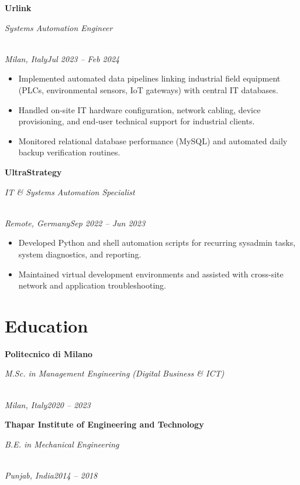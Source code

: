 \documentclass[a4paper,10pt]{article}
\newcommand{\role}[4]{\vspace{3pt}\noindent\hspace{0.6em}\parbox[t]{0.38\textwidth}{\raggedright\textbf{#1}}\hfill\parbox[t]{0.58\textwidth}{\raggedleft\textit{#2}}\\{\textit{#3}\hfill\textit{#4}}\vspace{1pt}}
\begin{document}
\role{Urlink}{Systems Automation Engineer}{Milan, Italy}{Jul 2023 -- Feb 2024}
\begin{itemize}
\item Implemented automated data pipelines linking industrial field equipment (PLCs, environmental sensors, IoT gateways) with central IT databases.
\item Handled on-site IT hardware configuration, network cabling, device provisioning, and end-user technical support for industrial clients.
\item Monitored relational database performance (MySQL) and automated daily backup verification routines.
\end{itemize}

\role{UltraStrategy}{IT \& Systems Automation Specialist}{Remote, Germany}{Sep 2022 -- Jun 2023}
\begin{itemize}
\item Developed Python and shell automation scripts for recurring sysadmin tasks, system diagnostics, and reporting.
\item Maintained virtual development environments and assisted with cross-site network and application troubleshooting.
\end{itemize}

\section{Education}
\role{Politecnico di Milano}{M.Sc. in Management Engineering (Digital Business \& ICT)}{Milan, Italy}{2020 -- 2023}
\role{Thapar Institute of Engineering and Technology}{B.E. in Mechanical Engineering}{Punjab, India}{2014 -- 2018}
\end{document}
